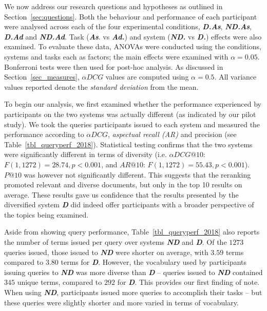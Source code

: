 We now address our research questions and hypotheses as outlined in Section~\ref{sec:questions}. Both the behaviour and performance of each participant were analysed across each of the four experimental conditions, \textbf{\emph{D.As}}, \textbf{\emph{ND.As}}, \textbf{\emph{D.Ad}} and \textbf{\emph{ND.Ad}}. Task (\emph{\textbf{As}}. vs \emph{\textbf{Ad.}}) and system (\emph{\textbf{ND.}} vs \emph{\textbf{D.}}) effects were also examined. To evaluate these data, ANOVAs were conducted using the conditions, systems and tasks each as factors; the main effects were examined with $\alpha=0.05$. Bonferroni tests were then used for post-hoc analysis. As discussed in Section~\ref{sec_measures}, $\alpha DCG$ values are computed using $\alpha=0.5$. All variance values reported denote the \emph{standard deviation} from the mean.

To begin our analysis, we first examined whether the performance experienced by participants on the two systems was actually different (as indicated by our pilot study). We took the queries participants issued to each system and measured the performance according to $\alpha DCG$, \emph{aspectual recall (AR)} and precision (see Table~\ref{tbl_queryperf_2018}). Statistical testing confirms that the two systems were significantly different in terms of diversity (i.e. $\alpha DCG@10$: $F(1, 1272)=28.74, p<0.001$, and $AR@10$: $F(1, 1272)=55.43, p<0.001$). $P@10$ was however not significantly different. This suggests that the reranking promoted relevant and diverse documents, but only in the top 10 results on average. These results gave us confidence that the results presented by the diversified system \textbf{\emph{D}} did indeed offer participants with a broader perspective of the topics being examined.
 
Aside from showing query performance, Table~\ref{tbl_queryperf_2018} also reports the number of terms issued per query over systems \textbf{\emph{ND}} and \textbf{\emph{D}}. Of the $1273$ queries issued, those issued to \textbf{\emph{ND}} were shorter on average, with $3.59$ terms compared to $3.80$ terms for \textbf{\emph{D}}. However, the vocabulary used by participants issuing queries to \textbf{\emph{ND}} was more diverse than \textbf{\emph{D}} -- queries issued to \textbf{\emph{ND}} contained $345$ unique terms, compared to $292$ for \textbf{\emph{D}}.
This provides our first finding of note. When using \textbf{\emph{ND}}, participants issued more queries to accomplish their tasks -- but these queries were slightly shorter and more varied in terms of vocabulary.

